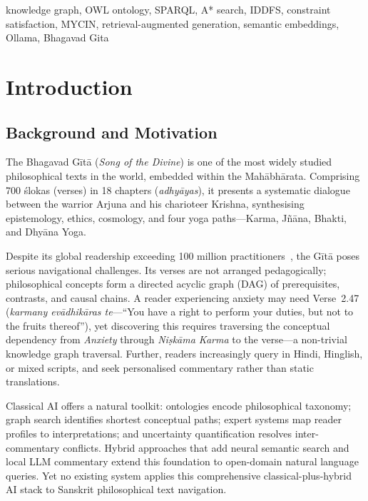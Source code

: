 \documentclass[conference]{IEEEtran}
\begin{document}
\begin{IEEEkeywords}
knowledge graph, OWL ontology, SPARQL, A* search, IDDFS, constraint satisfaction,
MYCIN, retrieval-augmented generation, semantic embeddings, Ollama, Bhagavad Gita
\end{IEEEkeywords}

\section{Introduction}

\subsection{Background and Motivation}

The Bhagavad G\={i}t\={a} (\textit{Song of the Divine}) is one of the most
widely studied philosophical texts in the world, embedded within the
Mah\={a}bh\={a}rata. Comprising 700 \'{s}lokas (verses) in 18 chapters
(\textit{adhy\={a}yas}), it presents a systematic dialogue between the warrior
Arjuna and his charioteer Krishna, synthesising epistemology, ethics, cosmology,
and four yoga paths—Karma, J\~{n}\={a}na, Bhakti, and Dhy\={a}na Yoga.

Despite its global readership exceeding 100 million practitioners~\cite{flood1996introduction},
the G\={i}t\={a} poses serious navigational challenges. Its verses are not arranged
pedagogically; philosophical concepts form a directed acyclic graph (DAG) of
prerequisites, contrasts, and causal chains. A reader experiencing anxiety may
need Verse~2.47 (\textit{karmany ev\={a}dhik\={a}ras te}—``You have a right to
perform your duties, but not to the fruits thereof''), yet discovering this
requires traversing the conceptual dependency from \textit{Anxiety} through
\textit{Ni\d{s}k\={a}ma Karma} to the verse—a non-trivial knowledge graph
traversal. Further, readers increasingly query in Hindi, Hinglish, or mixed
scripts, and seek personalised commentary rather than static translations.

Classical AI offers a natural toolkit: ontologies encode philosophical taxonomy;
graph search identifies shortest conceptual paths; expert systems map reader
profiles to interpretations; and uncertainty quantification resolves
inter-commentary conflicts. Hybrid approaches that add neural semantic search
and local LLM commentary extend this foundation to open-domain natural language
queries. Yet no existing system applies this comprehensive classical-plus-hybrid
AI stack to Sanskrit philosophical text navigation.
\end{document}
